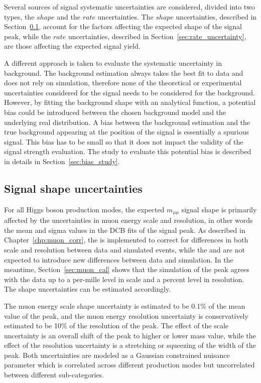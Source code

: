Several sources of signal systematic uncertainties are considered, divided into two types, the $shape$ and the $rate$ uncertainties.
The $shape$ uncertainties, described in Section~\ref{sec:shape_uncertainty}, account for the factors affecting the expected shape of the signal peak, 
while the $rate$ uncertainties, described in Section~\ref{sec:rate_uncertainty}, are those affecting the expected signal yield.

A different approach is taken to evaluate the systematic uncertainty in background.
The background estimation always takes the best fit to data and does not rely on simulation,
therefore none of the theoretical or experimental uncertainties considered for the signal needs to be considered for the background.
However, by fitting the background shape with an analytical function, 
a potential bias could be introduced between the chosen background model and the underlying real distribution.
A bias between the background estimation and the true background appearing at the position of the signal is essentially a spurious signal.
This bias has to be small so that it does not impact the validity of the signal strength evaluation.
The study to evaluate this potential bias is described in details in Section~\ref{sec:bias_study}. 

\subsection{Signal shape uncertainties}\label{sec:shape_uncertainty}
For all Higgs boson production modes, the expected $m_{\mu\mu}$ signal shape is primarily affected by the uncertainties in muon energy scale and resolution,
in other words the mean and sigma values in the DCB fits of the signal peak. 
As described in Chapter~\ref{chp:muon_corr}, the \RochCorr is implemented to correct for differences in both scale and resolution between data and simulated events, 
while the \FSR and \GeoFit are not expected to introduce new differences between data and simulation.
In the meantime, Section~\ref{sec:muon_cal} shows that the simulation of the \DY peak agrees with the data up to a per-mille level in scale and a percent level in resolution.
The shape uncertainties can be estimated accordingly.

The muon energy scale shape uncertainty is estimated to be 0.1\% of the mean value of the \mmm peak, 
and the muon energy resolution uncertainty is conservatively estimated to be 10\% of the resolution of the \mmm peak. 
The effect of the scale uncertainty is an overall shift of the \mmm peak to higher or lower mass value,
while the effect of the resolution uncertainty is a stretching or squeezing of the width of the \mmm peak.
Both uncertainties are modeled as a Gaussian constrained nuisance parameter 
which is correlated across different production modes but uncorrelated between different sub-categories.


